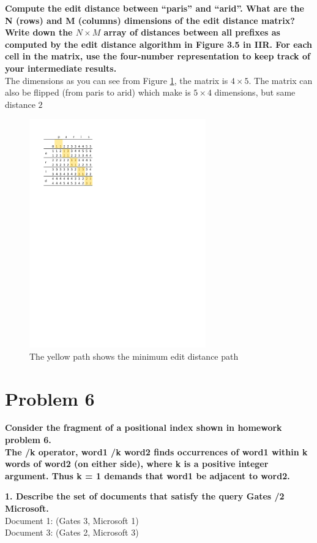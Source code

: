 \documentclass{article}
\begin{document}
\textbf{Compute the edit distance between “paris” and “arid”. What are the N (rows) and M (columns) dimensions of the edit distance matrix? Write down the $N \times M$ array of distances between all prefixes as computed by the edit distance algorithm in Figure 3.5 in IIR. For each cell in the matrix, use the four-number representation to keep track of your intermediate results.}
\\
The dimensions as you can see from Figure \ref{distmatrix}, the matrix is $4 \times 5$. The matrix can also be flipped (from paris to arid) which make is $5 \times 4$ dimensions, but same distance $2$
\begin{figure}[H]
\begin{center}
\includegraphics[width=3in]{Workbook1.pdf}
\caption{The yellow path shows the minimum edit distance path}
\label{distmatrix}
\end{center}
\end{figure}

\section{Problem 6}

\textbf{Consider the fragment of a positional index shown in homework problem 6. \\
The /k operator, word1 /k word2 finds occurrences of word1 within k words of word2 (on either side), where k is a positive integer argument. Thus k = 1 demands that word1 be adjacent to word2.}

\textbf{1. Describe the set of documents that satisfy the query Gates /2 Microsoft.}\\
Document 1: (Gates 3, Microsoft 1) \\
Document 3: (Gates 2, Microsoft 3)
\end{document}
